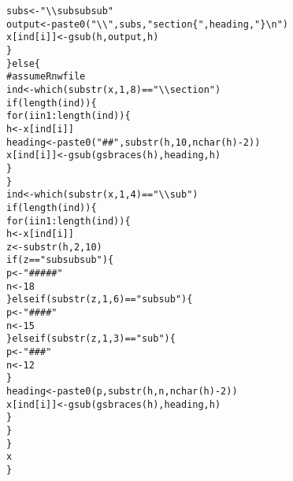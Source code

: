 \documentclass{article}\usepackage[]{graphicx}\usepackage[]{color}
\makeatletter
\newcommand{\hlnum}[1]{\textcolor[rgb]{0.863,0.196,0.184}{#1}}%
\newcommand{\hlstr}[1]{\textcolor[rgb]{0.863,0.196,0.184}{#1}}%
\newcommand{\hlcom}[1]{\textcolor[rgb]{0.345,0.431,0.459}{#1}}%
\newcommand{\hlopt}[1]{\textcolor[rgb]{0.576,0.631,0.631}{#1}}%
\newcommand{\hlstd}[1]{\textcolor[rgb]{0.514,0.58,0.588}{#1}}%
\newcommand{\hlkwa}[1]{\textcolor[rgb]{0.796,0.294,0.086}{#1}}%
\newcommand{\hlkwb}[1]{\textcolor[rgb]{0.522,0.6,0}{#1}}%
\newcommand{\hlkwd}[1]{\textcolor[rgb]{0.576,0.631,0.631}{#1}}%
\newenvironment{kframe}{%
 \def\at@end@of@kframe{}%
 \ifinner\ifhmode%
  \def\at@end@of@kframe{\end{minipage}}%
  \begin{minipage}{\columnwidth}%
 \fi\fi%
 \def\FrameCommand##1{\hskip\@totalleftmargin \hskip-\fboxsep
 \colorbox{shadecolor}{##1}\hskip-\fboxsep
     \hskip-\linewidth \hskip-\@totalleftmargin \hskip\columnwidth}%
 \MakeFramed {\advance\hsize-\width
   \@totalleftmargin\z@ \linewidth\hsize
   \@setminipage}}%
 {\par\unskip\endMakeFramed%
 \at@end@of@kframe}
\newenvironment{knitrout}{}{} %
\makeatother
\begin{document}
\begin{knitrout}
\begin{kframe}
\begin{alltt}
                  \hlstd{subs} \hlkwb{<-} \hlstr{"\textbackslash{}\textbackslash{}subsubsub"}
                \hlstd{output} \hlkwb{<-} \hlkwd{paste0}\hlstd{(}\hlstr{"\textbackslash{}\textbackslash{}"}\hlstd{, subs,} \hlstr{"section\{"}\hlstd{, heading,} \hlstr{"\}\textbackslash{}n"}\hlstd{)}
                \hlstd{x[ind[i]]} \hlkwb{<-} \hlkwd{gsub}\hlstd{(h, output, h)}
            \hlstd{\}}
        \hlstd{\}} \hlkwa{else} \hlstd{\{}
            \hlcom{# assume Rnw file}
            \hlstd{ind} \hlkwb{<-} \hlkwd{which}\hlstd{(}\hlkwd{substr}\hlstd{(x,} \hlnum{1}\hlstd{,} \hlnum{8}\hlstd{)} \hlopt{==} \hlstr{"\textbackslash{}\textbackslash{}section"}\hlstd{)}
            \hlkwa{if} \hlstd{(}\hlkwd{length}\hlstd{(ind)) \{}
                \hlkwa{for} \hlstd{(i} \hlkwa{in} \hlnum{1}\hlopt{:}\hlkwd{length}\hlstd{(ind)) \{}
                  \hlstd{h} \hlkwb{<-} \hlstd{x[ind[i]]}
                  \hlstd{heading} \hlkwb{<-} \hlkwd{paste0}\hlstd{(}\hlstr{"## "}\hlstd{,} \hlkwd{substr}\hlstd{(h,} \hlnum{10}\hlstd{,} \hlkwd{nchar}\hlstd{(h)} \hlopt{-} \hlnum{2}\hlstd{))}
                  \hlstd{x[ind[i]]} \hlkwb{<-} \hlkwd{gsub}\hlstd{(}\hlkwd{gsbraces}\hlstd{(h), heading, h)}
                \hlstd{\}}
            \hlstd{\}}
            \hlstd{ind} \hlkwb{<-} \hlkwd{which}\hlstd{(}\hlkwd{substr}\hlstd{(x,} \hlnum{1}\hlstd{,} \hlnum{4}\hlstd{)} \hlopt{==} \hlstr{"\textbackslash{}\textbackslash{}sub"}\hlstd{)}
            \hlkwa{if} \hlstd{(}\hlkwd{length}\hlstd{(ind)) \{}
                \hlkwa{for} \hlstd{(i} \hlkwa{in} \hlnum{1}\hlopt{:}\hlkwd{length}\hlstd{(ind)) \{}
                  \hlstd{h} \hlkwb{<-} \hlstd{x[ind[i]]}
                  \hlstd{z} \hlkwb{<-} \hlkwd{substr}\hlstd{(h,} \hlnum{2}\hlstd{,} \hlnum{10}\hlstd{)}
                  \hlkwa{if} \hlstd{(z} \hlopt{==} \hlstr{"subsubsub"}\hlstd{) \{}
                    \hlstd{p} \hlkwb{<-} \hlstr{"##### "}
                    \hlstd{n} \hlkwb{<-} \hlnum{18}
                  \hlstd{\}} \hlkwa{else if} \hlstd{(}\hlkwd{substr}\hlstd{(z,} \hlnum{1}\hlstd{,} \hlnum{6}\hlstd{)} \hlopt{==} \hlstr{"subsub"}\hlstd{) \{}
                    \hlstd{p} \hlkwb{<-} \hlstr{"#### "}
                    \hlstd{n} \hlkwb{<-} \hlnum{15}
                  \hlstd{\}} \hlkwa{else if} \hlstd{(}\hlkwd{substr}\hlstd{(z,} \hlnum{1}\hlstd{,} \hlnum{3}\hlstd{)} \hlopt{==} \hlstr{"sub"}\hlstd{) \{}
                    \hlstd{p} \hlkwb{<-} \hlstr{"### "}
                    \hlstd{n} \hlkwb{<-} \hlnum{12}
                  \hlstd{\}}
                  \hlstd{heading} \hlkwb{<-} \hlkwd{paste0}\hlstd{(p,} \hlkwd{substr}\hlstd{(h, n,} \hlkwd{nchar}\hlstd{(h)} \hlopt{-} \hlnum{2}\hlstd{))}
                  \hlstd{x[ind[i]]} \hlkwb{<-} \hlkwd{gsub}\hlstd{(}\hlkwd{gsbraces}\hlstd{(h), heading, h)}
                \hlstd{\}}
            \hlstd{\}}
        \hlstd{\}}
        \hlstd{x}
    \hlstd{\}}


\end{alltt}
\end{kframe}
\end{knitrout}
\end{document}
